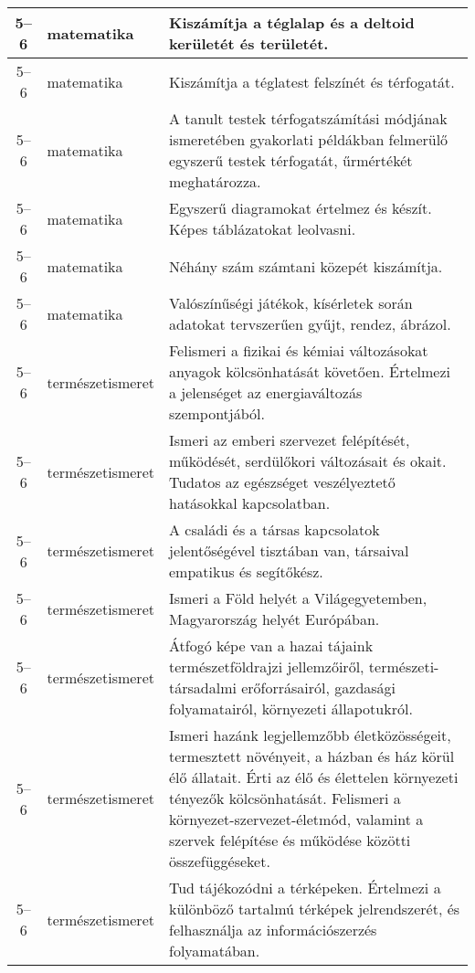 \begin{small}
\begin{longtable}{c | p{2cm} |  p{11cm} }
              5--6 & matematika & Kiszámítja a téglalap és a deltoid kerületét és területét.
 \\ \hline
              5--6 & matematika & Kiszámítja a téglatest felszínét és térfogatát. \\ \hline
              5--6 & matematika & A tanult testek térfogatszámítási módjának ismeretében gyakorlati példákban felmerülő egyszerű testek térfogatát, űrmértékét meghatározza. \\ \hline
              5--6 & matematika & Egyszerű diagramokat értelmez és  készít. Képes táblázatokat leolvasni.
 \\ \hline
              5--6 & matematika & Néhány szám számtani közepét kiszámítja. \\ \hline
              5--6 & matematika & Valószínűségi játékok, kísérletek során adatokat tervszerűen gyűjt, rendez, ábrázol. \\ \hline
              5--6 & természet\-ismeret & Felismeri a fizikai és kémiai változásokat anyagok kölcsönhatását követően. Értelmezi a jelenséget az energiaváltozás szempontjából. \\ \hline
              5--6 & természet\-ismeret & Ismeri az emberi szervezet felépítését, működését, serdülőkori változásait és okait. Tudatos az egészséget veszélyeztető hatásokkal kapcsolatban. \\ \hline
              5--6 & természet\-ismeret & A családi és a társas kapcsolatok jelentőségével tisztában van, társaival empatikus és segítőkész. \\ \hline
              5--6 & természet\-ismeret & Ismeri a Föld helyét a Világegyetemben, Magyarország helyét Európában. \\ \hline
              5--6 & természet\-ismeret & Átfogó képe van a hazai tájaink természetföldrajzi jellemzőiről, természeti-társadalmi erőforrásairól, gazdasági folyamatairól, környezeti állapotukról. \\ \hline
              5--6 & természet\-ismeret & Ismeri hazánk legjellemzőbb életközösségeit, termesztett növényeit, a házban és ház körül élő állatait. Érti az élő és élettelen környezeti tényezők kölcsönhatását. Felismeri a környezet-szervezet-életmód, valamint a szervek felépítése és működése közötti összefüggéseket. \\ \hline
              5--6 & természet\-ismeret & Tud tájékozódni a térképeken. Értelmezi a különböző tartalmú térképek jelrendszerét, és felhasználja az információszerzés folyamatában. \\ \hline

\end{longtable}
\end{small}
